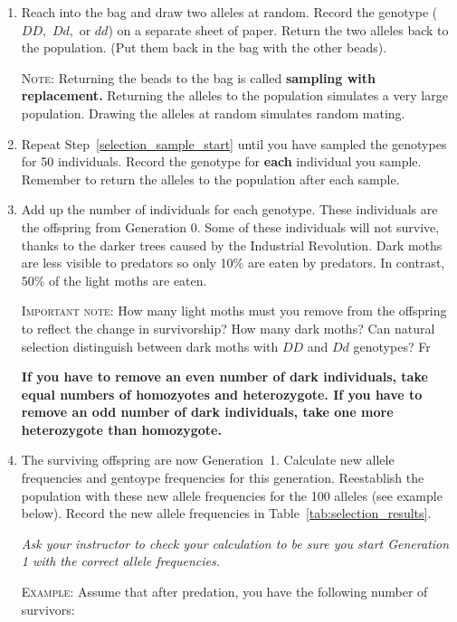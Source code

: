 \documentclass[12pt, hidelinks]{exam}
\newcommand{\allele}[1]{$#1$}
\begin{document}
\begin{questions}
\begin{enumerate}
	\item \label{selection_sample_start} Reach into the bag and draw two alleles at random. Record the genotype (\allele{DD,} \allele{Dd,} or \allele{dd}) on a separate sheet of paper. Return the two alleles back to the population. (Put them back in the bag with the other beads).
	
	\textsc{Note:} Returning the beads to the bag is called \textbf{sampling with replacement.} Returning the alleles to the population simulates a very large population. Drawing the alleles at random simulates random mating.
	
	\item Repeat Step~\ref{selection_sample_start} until you have sampled the genotypes for 50 individuals. Record the genotype for \textbf{each} individual you sample. Remember to return the alleles to the population after each sample. 
	
	\item Add up the number of individuals for each genotype. These individuals are the offspring from Generation 0. Some of these individuals will not survive, thanks to the darker trees caused by the Industrial Revolution. Dark moths are less visible to predators so only 10\% are eaten by predators. In contrast, 50\% of the light moths are eaten. 
	
	\textsc{Important note:} How many light moths must you remove from the offspring to reflect the change in survivorship? How many dark moths? Can natural selection distinguish between dark moths with \allele{DD} and \allele{Dd} genotypes? Fr
	
	\textbf{If you have to remove an even number of dark individuals, take equal numbers of homozyotes and heterozygote. If you have to remove an odd number of dark individuals, take one more heterozygote than homozygote.}
	
	\item \label{selection_sample_stop} The surviving offspring are now Generation~1. Calculate new allele frequencies and gentoype frequencies for this generation. Reestablish the population with these new allele frequencies for the 100 alleles (see example below). Record the new allele frequencies in Table~\ref{tab:selection_results}.
	
	\textit{Ask your instructor to check your calculation to be sure you start Generation 1 with the correct allele frequencies.}
	
	\textsc{Example:} Assume that after predation, you have the following number of survivors:
	

\end{enumerate}
\end{questions}
\end{document}
